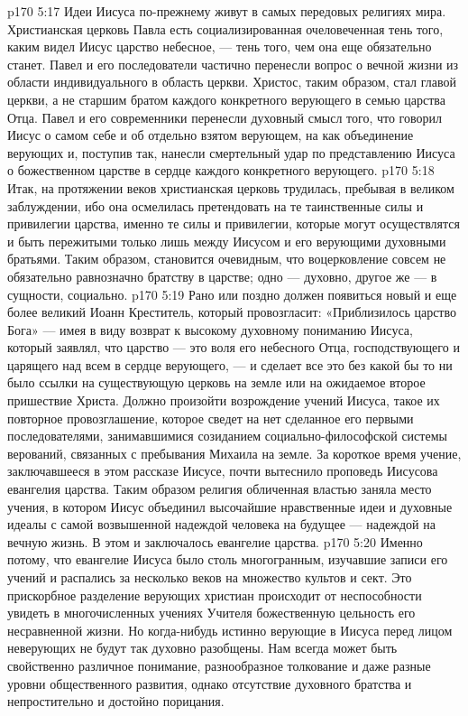 \vs p170 5:17 Идеи Иисуса по\hyp{}прежнему живут в самых передовых религиях мира. Христианская церковь Павла есть социализированная очеловеченная тень того, каким видел Иисус царство небесное, --- тень того, чем она еще обязательно станет. Павел и его последователи частично перенесли вопрос о вечной жизни из области индивидуального в область церкви. Христос, таким образом, стал главой церкви, а не старшим братом каждого конкретного верующего в семью царства Отца. Павел и его современники перенесли духовный смысл того, что говорил Иисус о самом себе и об отдельно взятом верующем, на  как объединение верующих и, поступив так, нанесли смертельный удар по представлению Иисуса о божественном царстве в сердце каждого конкретного верующего.
\vs p170 5:18 Итак, на протяжении веков христианская церковь трудилась, пребывая в великом заблуждении, ибо она осмелилась претендовать на те таинственные силы и привилегии царства, именно те силы и привилегии, которые могут осуществлятся и быть пережитыми только лишь между Иисусом и его верующими духовными братьями. Таким образом, становится очевидным, что воцерковление совсем не обязательно равнозначно братству в царстве; одно --- духовно, другое же --- в сущности, социально.
\vs p170 5:19 Рано или поздно должен появиться новый и еще более великий Иоанн Креститель, который провозгласит: «Приблизилось царство Бога» --- имея в виду возврат к высокому духовному пониманию Иисуса, который заявлял, что царство --- это воля его небесного Отца, господствующего и царящего над всем в сердце верующего, --- и сделает все это без какой бы то ни было ссылки на существующую церковь на земле или на ожидаемое второе пришествие Христа. Должно произойти возрождение  учений Иисуса, такое их повторное провозглашение, которое сведет на нет сделанное его первыми последователями, занимавшимися созиданием социально\hyp{}философской системы верований, связанных с  пребывания Михаила на земле. За короткое время учение, заключавшееся в этом рассказе  Иисусе, почти вытеснило проповедь Иисусова евангелия царства. Таким образом религия обличенная властью заняла место учения, в котором Иисус объединил высочайшие нравственные идеи и духовные идеалы с самой возвышенной надеждой человека на будущее --- надеждой на вечную жизнь. В этом и заключалось евангелие царства.
\vs p170 5:20 Именно потому, что евангелие Иисуса было столь многогранным, изучавшие записи его учений и распались за несколько веков на множество культов и сект. Это прискорбное разделение верующих христиан происходит от неспособности увидеть в многочисленных учениях Учителя божественную цельность его несравненной жизни. Но когда\hyp{}нибудь истинно верующие в Иисуса перед лицом неверующих не будут так духовно разобщены. Нам всегда может быть свойственно различное понимание, разнообразное толкование и даже разные уровни общественного развития, однако отсутствие духовного братства и непростительно и достойно порицания.
